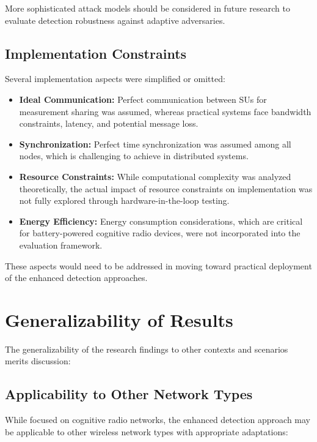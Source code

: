 More sophisticated attack models should be considered in future research to evaluate detection robustness against adaptive adversaries.

\subsection{Implementation Constraints}

Several implementation aspects were simplified or omitted:

\begin{itemize}
    \item \textbf{Ideal Communication:} Perfect communication between SUs for measurement sharing was assumed, whereas practical systems face bandwidth constraints, latency, and potential message loss.
    
    \item \textbf{Synchronization:} Perfect time synchronization was assumed among all nodes, which is challenging to achieve in distributed systems.
    
    \item \textbf{Resource Constraints:} While computational complexity was analyzed theoretically, the actual impact of resource constraints on implementation was not fully explored through hardware-in-the-loop testing.
    
    \item \textbf{Energy Efficiency:} Energy consumption considerations, which are critical for battery-powered cognitive radio devices, were not incorporated into the evaluation framework.
\end{itemize}

These aspects would need to be addressed in moving toward practical deployment of the enhanced detection approaches.

\section{Generalizability of Results}

The generalizability of the research findings to other contexts and scenarios merits discussion:

\subsection{Applicability to Other Network Types}

While focused on cognitive radio networks, the enhanced detection approach may be applicable to other wireless network types with appropriate adaptations:

